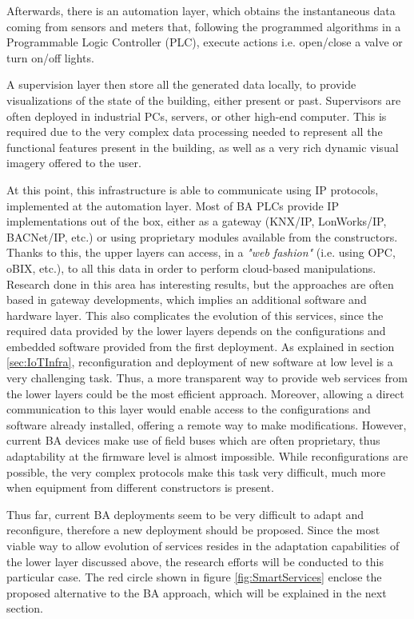 Afterwards, there is an automation layer, which obtains the instantaneous data coming from sensors and meters that, following the programmed algorithms in a Programmable Logic Controller (PLC), execute actions i.e. open/close a valve or turn on/off lights.

A supervision layer then store all the generated data locally, to provide visualizations of the state of the building, either present or past.
Supervisors are often deployed in industrial PCs, servers, or other high-end computer.
This is required due to the very complex data processing needed to represent all the functional features present in the building, as well as a very rich dynamic visual imagery offered to the user.

At this point, this infrastructure is able to communicate using IP protocols, implemented at the automation layer.
Most of BA PLCs provide IP implementations out of the box, either as a gateway (KNX/IP, LonWorks/IP, BACNet/IP, etc.)\cite{kastner2005commbas} or using proprietary modules available from the constructors.
Thanks to this, the upper layers can access, in a \textit{"web fashion"} (i.e. using OPC, oBIX, etc.)\cite{neugschwandtner2007knxtoobix}, to all this data in order to perform cloud-based manipulations.
Research done in this area has interesting results\cite{jung2013bainsmartcities}, but the approaches are often based in gateway developments, which implies an additional software and hardware layer.
This also complicates the evolution of this services, since the required data provided by the lower layers depends on the configurations and embedded software provided from the first deployment.
As explained in section \ref{sec:IoTInfra}, reconfiguration and deployment of new software at low level is a very challenging task.
Thus, a more transparent way to provide web services from the lower layers could be the most efficient approach.
Moreover, allowing a direct communication to this layer would enable access to the configurations and software already installed, offering a remote way to make modifications.
However, current BA devices make use of field buses which are often proprietary, thus adaptability at the firmware level is almost impossible.
While reconfigurations are possible, the very complex protocols make this task very difficult, much more when equipment from different constructors is present.

Thus far, current BA deployments seem to be very difficult to adapt and reconfigure, therefore a new deployment should be proposed.
Since the most viable way to allow evolution of services resides in the adaptation capabilities of the lower layer discussed above, the research efforts will be conducted to this particular case.
The red circle shown in figure \ref{fig:SmartServices} enclose the proposed alternative to the BA approach, which will be explained in the next section.

